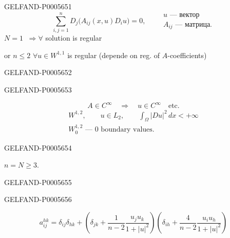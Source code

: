 \begin{GelfandAdjacentEvidence}{GELFAND-P000565}{1}
\[
\sum_{i,j=1}^{n}D_j\bigl(A_{ij}(x,u)D_i u\bigr)=0,
\qquad\begin{gathered}
u\text{ — вектор}\\
A_{ij}\text{ — матрица}.
\end{gathered}
\]
\underline{\(N=1\)} \(\ \Rightarrow\forall\) solution is regular

or \underline{\(n\leqslant2\)}\qquad
\(\forall u\in W^{1,1}\) is regular (depende on reg. of \(A\)-coefficients)
\end{GelfandAdjacentEvidence}
\begin{GelfandAdjacentEvidence}{GELFAND-P000565}{2}

\end{GelfandAdjacentEvidence}
\begin{GelfandAdjacentEvidence}{GELFAND-P000565}{3}

\[
A\in C^\infty\quad\Rightarrow\quad u\in C^\infty\quad\text{etc.}
\]
\begin{gather*}
W^{1,2},\qquad u\in L_2,\qquad \int_{\Omega}|Du|^2\,dx<+\infty\\
W_0^{1,2}\text{ — 0 boundary values.}
\end{gather*}
\end{GelfandAdjacentEvidence}
\begin{GelfandAdjacentEvidence}{GELFAND-P000565}{4}

\(n=\)\underline{\(N\geqslant3\)}\qquad{}.
\end{GelfandAdjacentEvidence}
\begin{GelfandAdjacentEvidence}{GELFAND-P000565}{5}

\end{GelfandAdjacentEvidence}
\begin{GelfandAdjacentEvidence}{GELFAND-P000565}{6}

\[
a_{ij}^{hk}=\delta_{ij}\delta_{hk}+
\left(\delta_{jk}+\frac1{n-2}\frac{u_j u_k}{1+|u|^2}\right)
\left(\delta_{ih}+\frac4{n-2}\frac{u_i u_h}{1+|u|^2}\right)
\]
\end{GelfandAdjacentEvidence}
